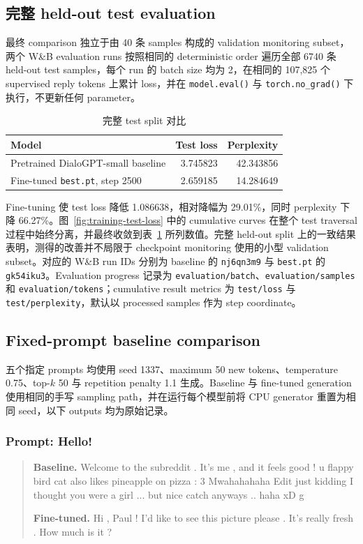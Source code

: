 \documentclass[12pt]{article}
\begin{document}
\subsection{完整 held-out test evaluation}

最终 comparison 独立于由 40 条 samples 构成的 validation monitoring subset，两个 W\&B evaluation runs 按照相同的 deterministic order 遍历全部 6740 条 held-out test samples，每个 run 的 batch size 均为 2，在相同的 107,825 个 supervised reply tokens 上累计 loss，并在 \texttt{model.eval()} 与 \texttt{torch.no\_grad()} 下执行，不更新任何 parameter。

\begin{table}[htbp]
\centering
\caption{完整 test split 对比}
\label{tab:test-results}
\begin{tabular}{lrr}
\toprule
Model & Test loss & Perplexity\\
\midrule
Pretrained DialoGPT-small baseline & 3.745823 & 42.343856\\
Fine-tuned \texttt{best.pt}, step 2500 & 2.659185 & 14.284649\\
\bottomrule
\end{tabular}
\end{table}

Fine-tuning 使 test loss 降低 1.086638，相对降幅为 29.01\%，同时 perplexity 下降 66.27\%。图~\ref{fig:training-test-loss} 中的 cumulative curves 在整个 test traversal 过程中始终分离，并最终收敛到表~\ref{tab:test-results} 所列数值。完整 held-out split 上的一致结果表明，测得的改善并不局限于 checkpoint monitoring 使用的小型 validation subset。对应的 W\&B run IDs 分别为 baseline 的 \texttt{nj6qn3m9} 与 \texttt{best.pt} 的 \texttt{gk54iku3}。Evaluation progress 记录为 \texttt{evaluation/batch}、\texttt{evaluation/samples} 和 \texttt{evaluation/tokens}；cumulative result metrics 为 \texttt{test/loss} 与 \texttt{test/perplexity}，默认以 processed samples 作为 step coordinate。

\subsection{Fixed-prompt baseline comparison}

五个指定 prompts 均使用 seed 1337、maximum 50 new tokens、temperature 0.75、top-$k$ 50 与 repetition penalty 1.1 生成。Baseline 与 fine-tuned generation 使用相同的手写 sampling path，并在运行每个模型前将 CPU generator 重置为相同 seed，以下 outputs 均为原始记录。

\subsubsection*{Prompt: Hello!}
\begin{quote}\small
\textbf{Baseline.} Welcome to the subreddit . It's me , and it feels good ! u flappy bird cat also likes pineapple on pizza : 3 Mwahahahaha Edit just kidding I thought you were a girl ... but nice catch anyways .. haha xD g

\textbf{Fine-tuned.} Hi , Paul ! I'd like to see this picture please . It's really fresh . How much is it ?
\end{quote}
\end{document}

